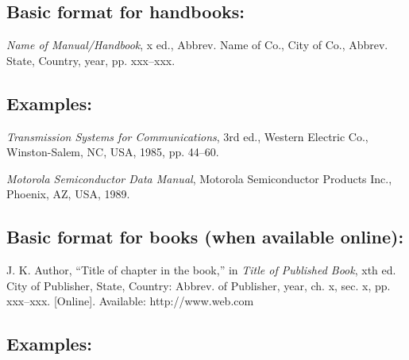 \documentclass[12pt,conference]{IEEEtran}
\begin{document}
\subsection*{Basic format for handbooks:}\vspace*{-12pt}
\begin{thebibliography}{34}
\item[]
{\em Name of Manual/Handbook}, x ed., Abbrev. Name of Co., City of Co., Abbrev. State, Country, year, pp. xxx--xxx.
\end{thebibliography}

\subsection*{Examples:}\vspace*{-12pt}

\begin{thebibliography}{34}
\setcounter{enumiv}{7}

\bibitem{} {\em Transmission Systems for Communications}, 3rd ed., Western Electric Co., Winston-Salem, NC, USA, 1985, pp. 44--60.

\bibitem{} {\em Motorola Semiconductor Data Manual}, Motorola Semiconductor Products Inc., Phoenix, AZ, USA, 1989.
\end{thebibliography}

\subsection*{Basic format for books (when available online):}\vspace*{-12pt}
\begin{thebibliography}{34}
\item[]
J. K. Author, ``Title of chapter in the book,'' in {\em Title of Published Book}, xth ed. City of Publisher, State, Country: Abbrev. of Publisher, year, ch. x, sec. x, pp. xxx--xxx. [Online]. Available: http://www.web.com 
\end{thebibliography}


\subsection*{Examples:}\vspace*{-12pt}
\end{document}
